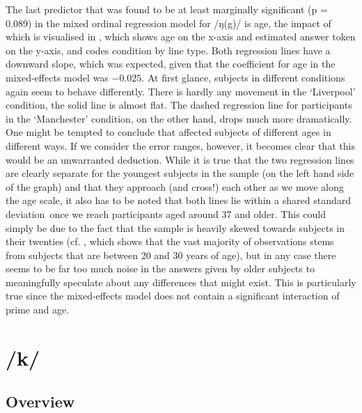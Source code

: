 The last predictor that was found to be at least marginally significant (p = 0.089) in the mixed ordinal regression model for /ŋ(g)/ is age, the impact of which is visualised in , which shows age on the x-axis and estimated answer token on the y-axis, and codes  condition by line type.
Both regression lines have a downward slope, which was expected, given that the coefficient for age in the mixed-effects model was \ensuremath{-0.025}.
At first glance, subjects in different  conditions again seem to behave differently.
There is hardly any movement in the `Liverpool' condition, the solid line is almost flat.
The dashed regression line for participants in the `Manchester' condition, on the other hand, drops much more dramatically.
One might be tempted to conclude that  affected subjects of different ages in different ways.
If we consider the error ranges, however, it becomes clear that this would be an unwarranted deduction.
While it is true that the two regression lines are clearly separate for the youngest subjects in the sample (on the left hand side of the graph) and that they approach (and cross!) each other as we move along the age scale, it also has to be noted that both lines lie within a shared standard deviation\ once we reach participants aged around 37 and older.
This could simply be due to the fact that the sample is heavily skewed towards subjects in their twenties (cf. , which shows that the vast majority of observations stems from subjects that are between 20 and 30 years of age), but in any case there seems to be far too much noise in the answers given by older subjects to meaningfully speculate about any differences that might exist.
This is particularly true since the mixed-effects model does not contain a significant interaction of prime and age.

\section{/k/}
\label{sec.perc_res.k}
	\subsection{Overview}
	\label{sec.perc_res.k.overview}


